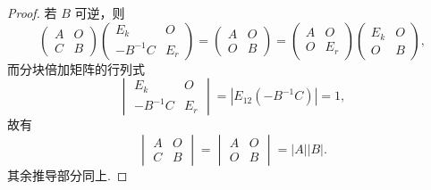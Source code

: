 \begin{enumerate}
\begin{proof}
              若 $B$ 可逆，则
              \[
                  \begin{pmatrix}
                      A & O \\ C & B
                  \end{pmatrix} \begin{pmatrix}
                      E_k & O \\ -B^{-1} C & E_r
                  \end{pmatrix} = \begin{pmatrix}
                      A & O \\ O & B
                  \end{pmatrix} = \begin{pmatrix}
                      A & O \\ O & E_r
                  \end{pmatrix} \begin{pmatrix}
                      E_k & O \\ O & B
                  \end{pmatrix},
              \]
              而分块倍加矩阵的行列式
              \[
                  \begin{vmatrix}
                      E_k & O \\ -B^{-1} C & E_r
                  \end{vmatrix} = |E_{12}(-B^{-1}C)| = 1,
              \]
              故有
              \[
                  \begin{vmatrix}
                      A & O \\ C & B
                  \end{vmatrix} = \begin{vmatrix}
                      A & O \\ O & B
                  \end{vmatrix} = |A||B|.
              \]
              其余推导部分同上.
          \end{proof}


\end{enumerate}
